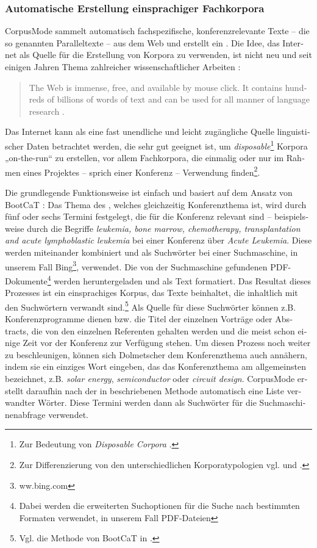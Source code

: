 \documentclass[output=paper]{LSP/langsci}
\begin{document}
\begin{otherlanguage}{ngerman}
\subsubsection{Automatische Erstellung einsprachiger Fachkorpora}\label{sec:fantinuoli:6.1.1}
\largerpage[-1]
CorpusMode sammelt automatisch fachspezifische, konferenzrelevante Texte -- die so genannten Paralleltexte -- aus dem Web und erstellt ein . Die Idee, das Internet als Quelle für die Erstellung von Korpora zu verwenden, ist nicht neu und seit einigen Jahren Thema zahlreicher wissenschaftlicher Arbeiten \citep{Ghani2001,Baroni2004}: 

\begin{quote}
The Web is immense, free, and available by mouse click. It contains hundreds of billions of words of text and can be used for all manner of language research \citep[333]{Kilgarriff2003}.
\end{quote}

Das Internet kann als eine fast unendliche und leicht zugängliche Quelle linguistischer Daten betrachtet werden, die sehr gut geeignet ist, um \textit{disposable}\footnote{ Zur Bedeutung von \textit{Disposable Corpora}  \citet{Varantola2003}.} Korpora „on-the-run“ zu erstellen, vor allem Fachkorpora, die einmalig oder nur im Rahmen eines Projektes -- sprich einer Konferenz -- Verwendung finden\footnote{Zur Differenzierung von den unterschiedlichen Korporatypologien vgl. \citet{Hansen-Schirra2008} und \citet{Lemnitzer2010}.}.

Die grundlegende Funktionsweise ist einfach und basiert auf dem Ansatz von BootCaT \citep{Baroni2004}: Das Thema des , welches gleichzeitig Konferenzthema ist, wird durch fünf oder sechs Termini festgelegt, die für die Konferenz relevant sind -- beispielsweise durch die Begriffe \textit{leukemia, bone marrow, chemotherapy, transplantation and acute lymphoblastic leukemia} bei einer Konferenz über \textit{Acute Leukemia}. Diese werden miteinander kombiniert und als Suchwörter bei einer Suchmaschine, in unserem Fall Bing\footnote{ ww.bing.com}, verwendet. Die von der Suchmaschine gefundenen PDF-Dokumente\footnote{Dabei werden die erweiterten Suchoptionen für die Suche nach bestimmten Formaten verwendet, in unserem Fall PDF-Dateien} werden heruntergeladen und als Text formatiert. Das Resultat dieses Prozesses ist ein einsprachiges Korpus, das Texte beinhaltet, die inhaltlich mit den Suchwörtern verwandt sind.\footnote{ Vgl. die Methode von BootCaT in \citet{Baroni2004}.} Als Quelle für diese Suchwörter können z.B. Konferenzprogramme dienen bzw. die Titel der einzelnen Vorträge oder Abstracts, die von den einzelnen Referenten gehalten werden und die meist schon einige Zeit vor der Konferenz zur Verfügung stehen. Um diesen Prozess noch weiter zu beschleunigen, können sich Dolmetscher dem Konferenzthema auch annähern, indem sie ein einziges Wort eingeben, das das Konferenzthema am allgemeinsten bezeichnet, z.B.\textit{ solar energy}, \textit{semiconductor} oder \textit{circuit design}. CorpusMode erstellt daraufhin nach der in  beschriebenen Methode automatisch eine Liste verwandter Wörter. Diese Termini werden dann als Suchwörter für die Suchmaschinenabfrage verwendet.


\end{otherlanguage}
\end{document}
